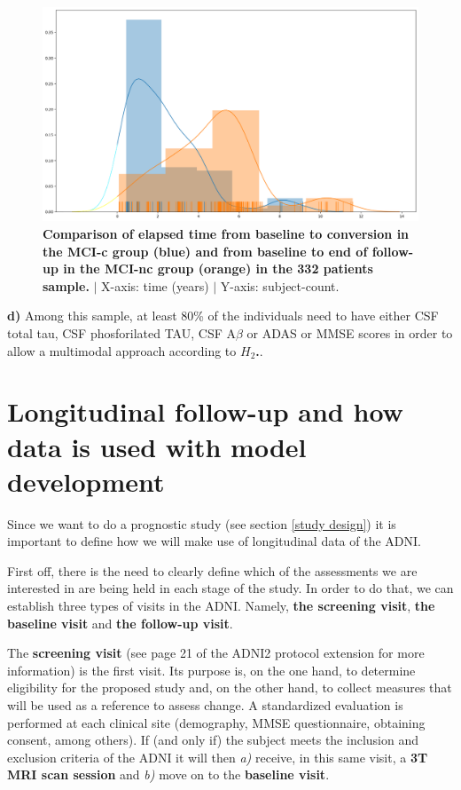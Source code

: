 \documentclass[a4paper,12pt]{elsarticle}  %
\begin{document}
	
	\begin{figure}[h]
		\centering
		\includegraphics[width=\textwidth]{compara_distribucions_conversio_followup.png}
		\caption{\textbf{Comparison of elapsed time from baseline to conversion in the MCI-c group (blue) and from baseline to end of follow-up in the MCI-nc group (orange) in the 332 patients sample.} $|$ X-axis: time (years) $|$ Y-axis: subject-count.}
		\label{fig:compara_distribucions_conversio_followup}
	\end{figure}
	\FloatBarrier
	
\textbf{d)} Among this sample, at least 80\% of the individuals need to have either CSF total tau, CSF phosforilated TAU, CSF A$\beta $ or ADAS or MMSE scores in order to allow a multimodal approach according to \textbf{\textit{$H_{2}$}.}.

	
\section{Longitudinal follow-up and how data is used with model development} \label{sec:explicacio_tresvisites_screening_baseline_followup}

	
Since we want to do a prognostic study (see section \ref{study design}) it is important to define how we will make use of longitudinal data of the ADNI.

First off, there is the need to clearly define which of the assessments we are interested in are being held in each stage of the study. In order to do that, we can establish three types of visits in the ADNI. Namely, \textbf{the screening visit}, \textbf{the baseline visit} and \textbf{the follow-up visit}.
		
The \textbf{screening visit} (see page 21 of the ADNI2 protocol extension\cite{adni2_protocol_extension} for more information) is the first visit. Its purpose is, on the one hand, to determine eligibility for the proposed study and, on the other hand, to collect measures that will be used as a reference to assess change. A standardized evaluation is performed at each clinical site (demography, MMSE questionnaire, obtaining consent, among others). If (and only if) the subject meets the inclusion and exclusion criteria of the ADNI it will then \textit{a)} receive, in this same visit, a \textbf{3T MRI scan session} and \textit{b)} move on to the \textbf{baseline visit}.
		
\end{document}
